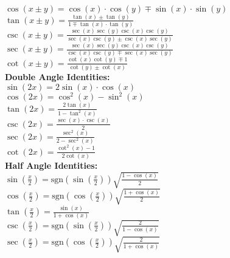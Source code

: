 \documentclass[12pt]{article}
\begin{document}
    \\ \( \cos( x \pm y ) = \cos( x ) \cdot \cos( y ) \mp \sin( x ) \cdot \sin( y ) \)
    \\ \( \tan( x \pm y ) = \displaystyle\frac{ \tan( x ) \pm \tan( y ) }{ 1 \mp \tan( x ) \cdot \tan( y ) } \)
    \\ \( \csc( x \pm y ) = \displaystyle\frac{ \sec( x ) \sec( y ) \csc( x ) \csc( y ) }{ \sec( x ) \csc( y ) \pm \csc( x ) \sec( y ) } \)
    \\ \( \sec( x \pm y ) = \displaystyle\frac{ \sec( x ) \sec( y ) \csc( x ) \csc( y ) }{ \csc( x ) \csc( y ) \mp \sec( x ) \sec( y ) } \)
    \\ \( \cot( x \pm y ) = \displaystyle\frac{ \cot( x ) \cot( y ) \mp 1 }{ \cot( y ) \pm \cot( x ) } \)
\\ \textbf{Double Angle Identities:}
    \\ \( \sin( 2x ) = 2 \sin( x ) \cdot \cos( x ) \)
    \\ \( \cos( 2x ) = \cos^2( x ) - \sin^2( x ) \)
    \\ \( \tan( 2x ) = \displaystyle\frac{ 2 \tan( x ) }{ 1 - \tan^2( x ) } \)
    \\ \( \csc( 2x ) = \displaystyle\frac{ \sec( x ) \cdot \csc( x ) }{ 2 } \)
    \\ \( \sec( 2x ) = \displaystyle\frac{ \sec^2( x ) }{ 2 - \sec^2( x ) } \)
    \\ \( \cot( 2x ) = \displaystyle\frac{ \cot^2( x ) - 1 }{ 2 \cot( x ) } \)
\\ \textbf{Half Angle Identities:}
    \\ \( \sin \left( \displaystyle\frac{ x }{ 2 } \right) = \text{sgn} \left( \sin \left( \displaystyle\frac{ x }{ 2 } \right) \right) \sqrt{ \displaystyle\frac{ 1 - \cos( x ) }{ 2 } } \)
    \\ \( \cos \left( \displaystyle\frac{ x }{ 2 } \right) = \text{sgn} \left( \cos \left( \displaystyle\frac{ x }{ 2 } \right) \right) \sqrt{ \displaystyle\frac{ 1 + \cos( x ) }{ 2 } } \)
    \\ \( \tan \left( \displaystyle\frac{ x }{ 2 } \right) = \displaystyle\frac{ \sin( x ) }{ 1 + \cos( x ) } \)
    \\ \( \csc \left( \displaystyle\frac{ x }{ 2 } \right) = \text{sgn} \left( \sin \left( \displaystyle\frac{ x }{ 2 } \right) \right) \sqrt{ \displaystyle\frac{ 2 }{ 1 - \cos( x ) } } \)
    \\ \( \sec \left( \displaystyle\frac{ x }{ 2 } \right) = \text{sgn} \left( \cos \left( \displaystyle\frac{ x }{ 2 } \right) \right) \sqrt{ \displaystyle\frac{ 2 }{ 1 + \cos( x ) } } \)
\end{document}

